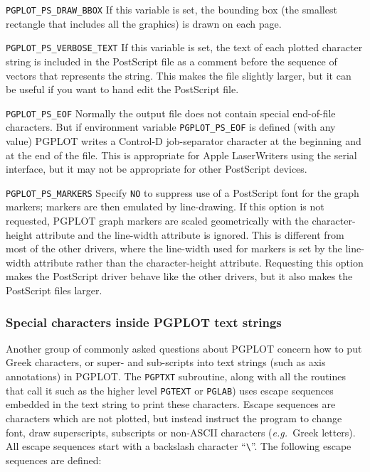 \documentclass[twoside,11pt]{starlink}
\begin{document}
\begin{description}
\item{\texttt{PGPLOT\_PS\_DRAW\_BBOX}} If this variable is set, the
bounding box (the smallest rectangle that includes all the graphics)
is drawn on each page.

\item{\texttt{PGPLOT\_PS\_VERBOSE\_TEXT}} If this variable is set, the
text of each plotted character string is included in the PostScript
file as a comment before the sequence of vectors that represents the
string. This makes the file slightly larger, but it can be useful if
you want to hand edit the PostScript file.

\item{\texttt{PGPLOT\_PS\_EOF}} Normally the output file does not contain
special end-of-file characters. But if environment variable \texttt{PGPLOT\_PS\_EOF} is defined (with any value) PGPLOT writes a Control-D
job-separator character at the beginning and at the end of the file.
This is appropriate for Apple LaserWriters using the serial interface,
but it may not be appropriate for other PostScript devices.

\item{\texttt{PGPLOT\_PS\_MARKERS}} Specify \texttt{NO} to suppress use of a
PostScript font for the graph markers; markers are then emulated by
line-drawing. If this option is not requested, PGPLOT graph markers
are scaled geometrically with the character-height attribute and the
line-width attribute is ignored. This is different from most of the
other drivers, where the line-width used for markers is set by the
line-width attribute rather than the character-height attribute.
Requesting this option makes the PostScript driver behave like the
other drivers, but it also makes the PostScript files larger.

\end{description}

\subsubsection{Special characters inside PGPLOT text strings}

Another group of commonly asked questions about PGPLOT concern how to
put Greek characters, or super- and sub-scripts into text strings
(such as axis annotations) in PGPLOT. The \texttt{PGPTXT} subroutine,
along with all the routines that call it such as the higher level \texttt{PGTEXT} or \texttt{PGLAB}) uses escape sequences embedded in the text
string to print these characters. Escape sequences are characters
which are not plotted, but instead instruct the program to change
font, draw superscripts, subscripts or non-ASCII characters (\emph{e.g.\ }Greek letters). All escape sequences start with a backslash
character ``\verb*|\|''. The following escape sequences are defined:
\end{document}
